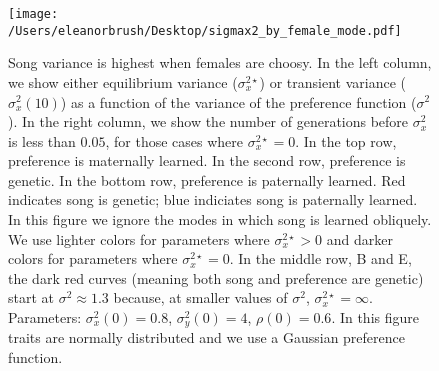 \documentclass{article}
\begin{document}
\begin{figure}
\texttt{[image: /Users/eleanorbrush/Desktop/sigmax2\_by\_female\_mode.pdf]}
\caption{\label{sigmax2_sigma2} Song variance is highest when females are choosy. In the left column, we show either equilibrium variance ($\sigma_x^{2\star}$) or transient variance ($\sigma_x^2(10)$) as a function of the variance of the preference function ($\sigma^2$). In the right column, we show the number of generations before $\sigma_x^2$ is less than $0.05$, for those cases where $\sigma_x^{2\star}=0$. In the top row, preference is maternally learned. In the second row, preference is genetic. In the bottom row, preference is paternally learned. Red indicates song is genetic; blue indiciates song is paternally learned. In this figure we ignore the modes in which song is learned obliquely. We use lighter colors for parameters where $\sigma_x^{2\star}>0$ and darker colors for parameters where $\sigma_x^{2\star}=0$. In the middle row, B and E, the dark red curves (meaning both song and preference are genetic) start at $\sigma^2\approx 1.3$ because, at smaller values of $\sigma^2$, $\sigma_x^{2\star}=\infty$. Parameters: $\sigma_x^2(0)=0.8$, $\sigma_y^2(0)=4$, $\rho(0)=0.6$. In this figure traits are normally distributed and we use a Gaussian preference function. }
\end{figure}
\end{document}
